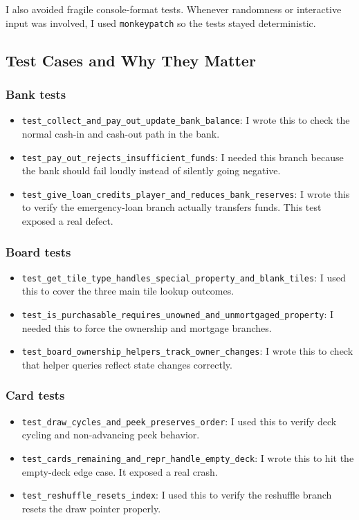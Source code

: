 \documentclass[12pt]{article}
\begin{document}
I also avoided fragile console-format tests. Whenever randomness or interactive input was involved, I used \texttt{monkeypatch} so the tests stayed deterministic.

\subsection{Test Cases and Why They Matter}
\subsubsection*{Bank tests}
\begin{itemize}
  \item \texttt{test\_collect\_and\_pay\_out\_update\_bank\_balance}: I wrote this to check the normal cash-in and cash-out path in the bank.
  \item \texttt{test\_pay\_out\_rejects\_insufficient\_funds}: I needed this branch because the bank should fail loudly instead of silently going negative.
  \item \texttt{test\_give\_loan\_credits\_player\_and\_reduces\_bank\_reserves}: I wrote this to verify the emergency-loan branch actually transfers funds. This test exposed a real defect.
\end{itemize}

\subsubsection*{Board tests}
\begin{itemize}
  \item \texttt{test\_get\_tile\_type\_handles\_special\_property\_and\_blank\_tiles}: I used this to cover the three main tile lookup outcomes.
  \item \texttt{test\_is\_purchasable\_requires\_unowned\_and\_unmortgaged\_property}: I needed this to force the ownership and mortgage branches.
  \item \texttt{test\_board\_ownership\_helpers\_track\_owner\_changes}: I wrote this to check that helper queries reflect state changes correctly.
\end{itemize}

\subsubsection*{Card tests}
\begin{itemize}
  \item \texttt{test\_draw\_cycles\_and\_peek\_preserves\_order}: I used this to verify deck cycling and non-advancing peek behavior.
  \item \texttt{test\_cards\_remaining\_and\_repr\_handle\_empty\_deck}: I wrote this to hit the empty-deck edge case. It exposed a real crash.
  \item \texttt{test\_reshuffle\_resets\_index}: I used this to verify the reshuffle branch resets the draw pointer properly.
\end{itemize}
\end{document}
